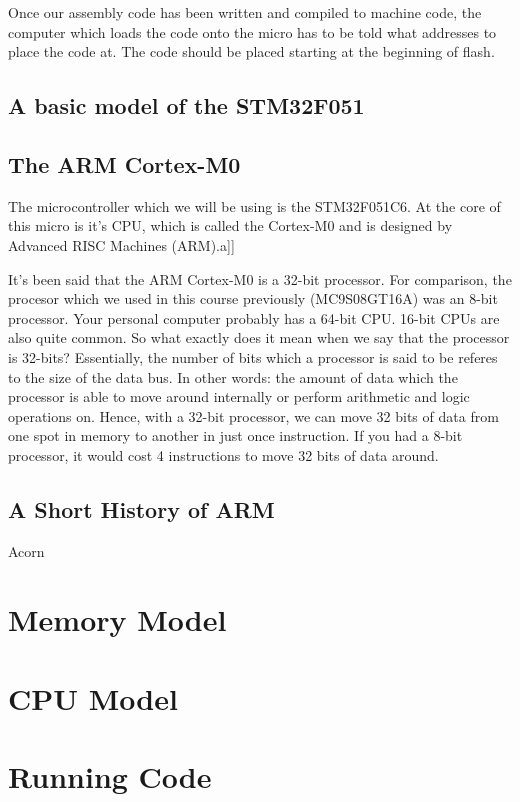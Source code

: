 Once our assembly code has been written and compiled to machine code, the computer which loads the code onto the micro has to be told what addresses to place the code at. The code should be placed starting at the beginning of flash. 


\subsection{A basic model of the STM32F051}

\subsection{The ARM Cortex-M0}
The microcontroller which we will be using is the STM32F051C6. At the core of this micro is it's CPU, which is called the Cortex-M0 and is designed by Advanced RISC Machines (ARM).a]]

It's been said that the ARM Cortex-M0 is a 32-bit processor. For comparison, the procesor which we used in this course previously (MC9S08GT16A) was an 8-bit processor. Your personal computer probably has a 64-bit CPU. 16-bit CPUs are also quite common. So what exactly does it mean when we say that the processor is 32-bits? Essentially, the number of bits which a processor is said to be referes to the size of the data bus. In other words: the amount of data which the processor is able to move around internally or perform arithmetic and logic operations on. Hence, with a 32-bit processor, we can move 32 bits of data from one spot in memory to another in just once instruction. If you had a 8-bit processor, it would cost 4 instructions to move 32 bits of data around.  



\subsection{A Short History of ARM}
Acorn

\section{Memory Model}

\section{CPU Model}

\section{Running Code}
